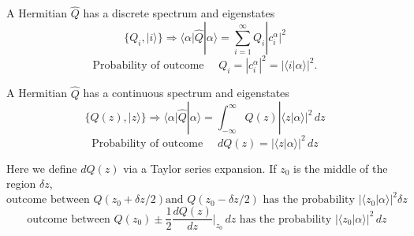 \begin{subbox}{}
  A Hermitian $\hat{Q}$ has a discrete spectrum and eigenstates \[ \{Q_i,
  |i\rangle\} \Rightarrow \langle \alpha | \hat{Q} | \alpha \rangle 
  = \sum_{i=1}^{\infty}  Q_i |c_i^\alpha|^2\] \[ \text{Probability of outcome
    } \quad Q_i
  = |c_i^\alpha|^2 = |\langle i | \alpha \rangle |^2. \] 

  A Hermitian $\hat{Q}$ has a continuous spectrum and eigenstates \[\{Q(z),
  |z\rangle\} \Rightarrow \langle \alpha | \hat{Q} | \alpha \rangle
= \int_{-\infty}^{\infty} Q(z)|\langle z | \alpha \rangle |^2 \, dz\] 
  \[ \text{Probability of outcome } \quad  dQ(z) = |\langle z | \alpha \rangle
  |^2 \, dz \]
\end{subbox}

Here we define $dQ(z)$ via a Taylor series expansion. If $z_0$ is the middle of
the region $\delta z$, \[ \text{outcome between } Q(z_0 + \delta z / 2) \text{
  and }
  Q(z_0 - \delta z / 2) \text{ has the probability } |\langle z_0 | \alpha \rangle |^2
  \delta z\] \[ \text{ outcome between } Q(z_0) \pm \frac{1}{2}
  \frac{dQ(z)}{dz}\Bigg|_{z_0} \, dz \text{ has the probability } |\langle z_0 | \alpha
\rangle |^2 \, dz\] 



































